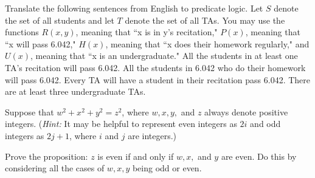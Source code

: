 \documentclass[twoside,12pt]{article}
\begin{document}
\begin{problem}{16}
Translate the following sentences from English to predicate logic. Let $S$ denote the set of all students and let $T$ denote the set of all TAs.  You may use the functions $R(x, y)$, meaning that ``x is in y's recitation," $P(x)$, meaning that ``x will pass 6.042," $H(x)$, meaning that ``x does their homework regularly," and $U(x)$, meaning that ``x is an undergraduate."
\bparts
{} All the students in at least one TA's recitation will pass 6.042.
 All the students in 6.042 who do their homework will pass 6.042.
 Every TA will have a student in their recitation pass 6.042.
 There are at least three undergraduate TAs.
\eparts
\end{problem}



\begin{problem}{20} Suppose that $w^2 + x^2 + y^2 = z^2$, where $w,x,y,$ and $z$
always denote positive integers. (\textit{Hint:} It may be helpful to represent even
integers as $2i$ and odd integers as $2j+1$, where $i$ and $j$ are integers.)

Prove the proposition: $z$ is even if and only if $w, x,$ and $y$ are even. Do
this by considering all the cases of $w,x,y$ being odd or even.
\end{problem}
\end{document}
